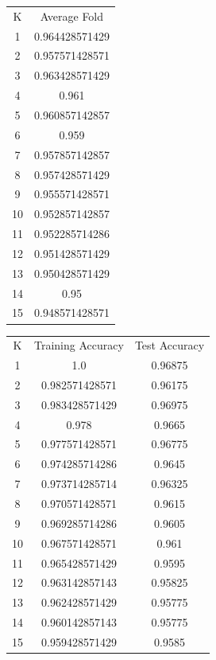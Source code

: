 \documentclass[letterpaper, 12]{article}
\begin{document}
\begin{center}
\begin{tabular}{ |c|c| } 
 \hline
K & Average Fold \\ 
1  &  0.964428571429\\
2  &  0.957571428571\\
3  &  0.963428571429\\
4  &  0.961\\
5  &  0.960857142857\\
6  &  0.959\\
7  &  0.957857142857\\
8  &  0.957428571429\\
9  &  0.955571428571\\
10  &  0.952857142857\\
11  &  0.952285714286\\
12  &  0.951428571429\\
13  &  0.950428571429\\
14  &  0.95\\
15  &  0.948571428571\\
 \hline
\end{tabular}
\end{center}



\begin{center}
\begin{tabular}{ |c|c|c| } 
\hline
K & Training Accuracy & Test Accuracy  \\
1  &  1.0  &  0.96875 \\
2  &  0.982571428571  &  0.96175 \\
3  &  0.983428571429  &  0.96975  \\
4  &  0.978  &  0.9665 \\
5  &  0.977571428571  &  0.96775 \\
6  &  0.974285714286  &  0.9645  \\
7  &  0.973714285714  &  0.96325 \\
8  &  0.970571428571  &  0.9615  \\
9  &  0.969285714286  &  0.9605  \\
10  &  0.967571428571  &  0.961 \\
11  &  0.965428571429  &  0.9595 \\
12  &  0.963142857143  &  0.95825 \\
13  &  0.962428571429  &  0.95775 \\
14  &  0.960142857143  &  0.95775 \\
15  &  0.959428571429  &  0.9585  \\
 \hline
\end{tabular}
\end{center}
\end{document}
